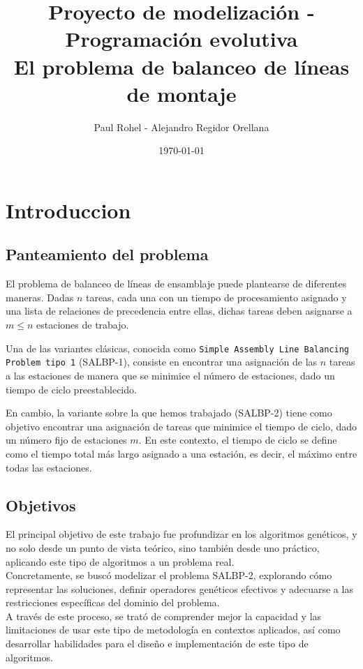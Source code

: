 \documentclass[12pt,a4paper]{report}
\title{Proyecto de modelización - Programación evolutiva\\ \textbf{El problema de balanceo de líneas de montaje}}
\author{Paul Rohel - Alejandro Regidor Orellana}
\date{\today}
\begin{document}
    \maketitle
    \tableofcontents

    \chapter{Introduccion}
    \section{Panteamiento del problema}
    El problema de balanceo de líneas de ensamblaje puede plantearse de diferentes maneras. Dadas $n$ tareas, cada una con un tiempo de procesamiento asignado y una lista de relaciones de precedencia entre ellas, dichas tareas deben asignarse a $m \leq n$ estaciones de trabajo.

    Una de las variantes clásicas, conocida como \texttt{Simple Assembly Line Balancing Problem tipo 1} (SALBP-1), consiste en encontrar una asignación de las $n$ tareas a las estaciones de manera que se minimice el número de estaciones, dado un tiempo de ciclo preestablecido.

    En cambio, la variante sobre la que hemos trabajado (SALBP-2) tiene como objetivo encontrar una asignación de tareas que minimice el tiempo de ciclo, dado un número fijo de estaciones $m$. En este contexto, el tiempo de ciclo se define como el tiempo total más largo asignado a una estación, es decir, el máximo entre todas las estaciones.

    \section{Objetivos}
    El principal objetivo de este trabajo fue profundizar en los algoritmos genéticos, y no solo desde un punto de vista teórico, sino también desde uno práctico, aplicando este tipo de algoritmos a un problema real.\\
    Concretamente, se buscó modelizar el problema SALBP-2, explorando cómo representar las soluciones, definir operadores genéticos efectivos y adecuarse a las restricciones específicas del dominio del problema.\\
    A través de este proceso, se trató de comprender mejor la capacidad y las limitaciones de usar este tipo de metodología en contextos aplicados, así como desarrollar habilidades para el diseño e implementación de este tipo de algoritmos.
\end{document}
